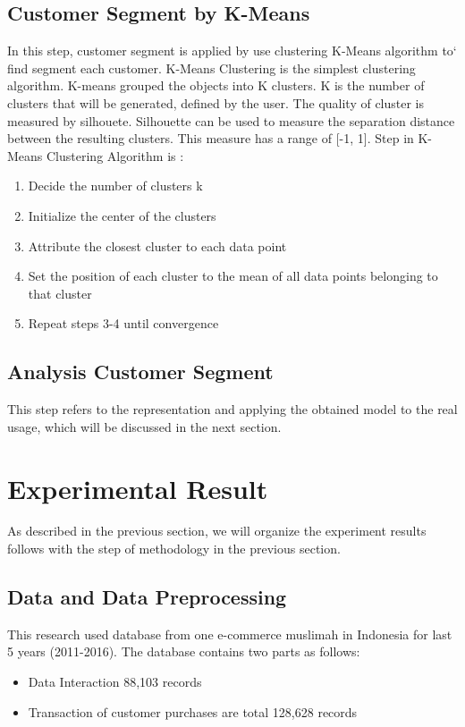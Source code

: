 \documentclass[conference]{IEEEtran}
\begin{document}
\subsection{Customer Segment by K-Means}
In this step, customer segment is applied by use clustering K-Means algorithm to` find segment each customer. K-Means Clustering is the simplest clustering algorithm. K-means grouped the objects into K clusters. K is the number of clusters that will be generated, defined by the user. The quality of cluster is measured by silhouete. Silhouette can be used to measure the separation distance between the resulting clusters. This measure has a range of [-1, 1]. Step in K-Means Clustering Algorithm is :
\begin{enumerate}
	\item Decide the number of clusters k
	\item Initialize the center of the clusters
	\item Attribute the closest cluster to each data point
	\item Set the position of each cluster to the mean of all data points belonging to that cluster
	\item Repeat steps 3-4 until convergence
\end{enumerate}


\subsection{Analysis Customer Segment}
This step refers to the representation and applying the obtained model to the real usage, which will be discussed in the next section.

\section{Experimental Result}
As described in the previous section, we will organize the experiment results follows with the step of methodology in the previous section.

\subsection{Data and Data Preprocessing}
This research used database from one e-commerce muslimah in Indonesia for last 5 years (2011-2016). The database contains two parts as follows:

\begin{itemize}
	\item Data Interaction 88,103 records
	\item Transaction of customer purchases are total 128,628 records
\end{itemize}
\end{document}
